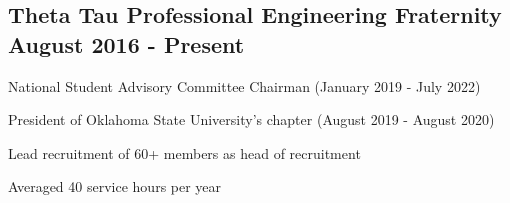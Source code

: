 \subsection{{Theta Tau Professional Engineering Fraternity \hfill  August 2016 - Present}}
\begin{zitemize}
\item National Student Advisory Committee Chairman (January 2019 - July 2022)
\item President of Oklahoma State University’s chapter (August 2019 - August 2020)
\item Lead recruitment of 60+ members as head of recruitment
\item Averaged 40 service hours per year
\end{zitemize}
